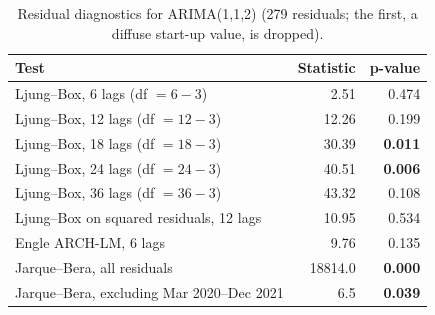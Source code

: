 \begin{table}[H]\centering\small
\caption{Residual diagnostics for ARIMA(1,1,2) (279 residuals; the first, a diffuse start-up value, is dropped).}\label{tab:diag}
\begin{tabular}{lrr}\toprule Test & Statistic & p-value\\\midrule
Ljung--Box, 6 lags (df $=6-3$) & 2.51 & 0.474\\
Ljung--Box, 12 lags (df $=12-3$) & 12.26 & 0.199\\
Ljung--Box, 18 lags (df $=18-3$) & 30.39 & \textbf{0.011}\\
Ljung--Box, 24 lags (df $=24-3$) & 40.51 & \textbf{0.006}\\
Ljung--Box, 36 lags (df $=36-3$) & 43.32 & 0.108\\
Ljung--Box on squared residuals, 12 lags & 10.95 & 0.534\\
Engle ARCH-LM, 6 lags & 9.76 & 0.135\\
Jarque--Bera, all residuals & 18814.0 & \textbf{0.000}\\
Jarque--Bera, excluding Mar 2020--Dec 2021 & 6.5 & \textbf{0.039}\\
\bottomrule\end{tabular}
\end{table}